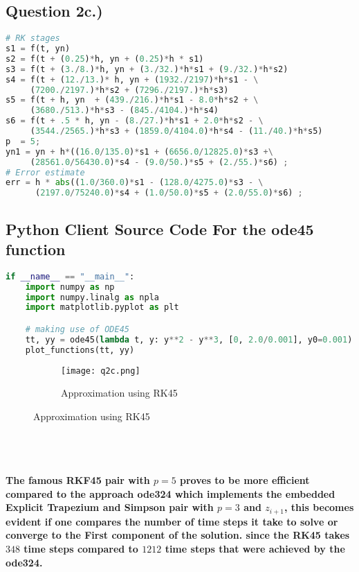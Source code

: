 \documentclass{article}
\begin{document}
\subsection*{Question 2c.)}
\begin{lstlisting}[language=Python]
# RK stages
s1 = f(t, yn)
s2 = f(t + (0.25)*h, yn + (0.25)*h * s1)
s3 = f(t + (3./8.)*h, yn + (3./32.)*h*s1 + (9./32.)*h*s2)
s4 = f(t + (12./13.)* h, yn + (1932./2197)*h*s1 - \
     (7200./2197.)*h*s2 + (7296./2197.)*h*s3)
s5 = f(t + h, yn  + (439./216.)*h*s1 - 8.0*h*s2 + \
     (3680./513.)*h*s3 - (845./4104.)*h*s4)
s6 = f(t + .5 * h, yn - (8./27.)*h*s1 + 2.0*h*s2 - \
     (3544./2565.)*h*s3 + (1859.0/4104.0)*h*s4 - (11./40.)*h*s5)
p  = 5;
yn1 = yn + h*((16.0/135.0)*s1 + (6656.0/12825.0)*s3 +\
     (28561.0/56430.0)*s4 - (9.0/50.)*s5 + (2./55.)*s6) ;
# Error estimate
err = h * abs((1.0/360.0)*s1 - (128.0/4275.0)*s3 - \
      (2197.0/75240.0)*s4 + (1.0/50.0)*s5 + (2.0/55.0)*s6) ;
\end{lstlisting}

\subsection*{ Python Client Source Code For the ode45 function}
\begin{lstlisting}[language=Python]
if __name__ == "__main__":
    import numpy as np
    import numpy.linalg as npla
    import matplotlib.pyplot as plt

    # making use of ODE45
    tt, yy = ode45(lambda t, y: y**2 - y**3, [0, 2.0/0.001], y0=0.001)
    plot_functions(tt, yy)
\end{lstlisting}
\begin{figure}[h!]
  \centering
  \begin{subfigure}{\linewidth}
    \texttt{[image: q2c.png]}
    \caption{Approximation using RK45}
  \end{subfigure}
\end{figure}

\textbf{\\ \\ \\The famous RKF45 pair with $p = 5$ proves to be more efficient compared to the approach ode324 which implements the embedded Explicit Trapezium and Simpson pair with $p = 3$ and $z_{i+1}$, this becomes evident if one compares the number of time steps it take to solve or converge to the First component of the solution. since the RK45 takes $348$ time steps compared to $1212$ time steps that were achieved by the ode324.}
\pagebreak
\end{document}
